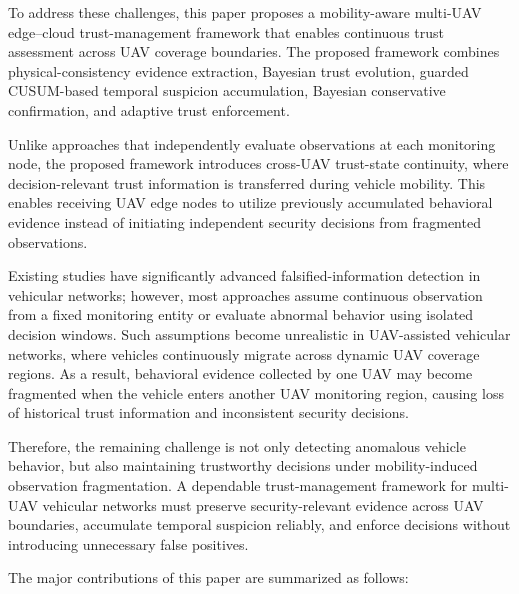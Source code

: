 \documentclass[journal]{IEEEtran}
\begin{document}
To address these challenges, this paper proposes a mobility-aware multi-UAV
edge--cloud trust-management framework that enables continuous trust
assessment across UAV coverage boundaries. The proposed framework combines
physical-consistency evidence extraction, Bayesian trust evolution, guarded
CUSUM-based temporal suspicion accumulation, Bayesian conservative
confirmation, and adaptive trust enforcement.

Unlike approaches that independently evaluate observations at each monitoring
node, the proposed framework introduces cross-UAV trust-state continuity,
where decision-relevant trust information is transferred during vehicle
mobility. This enables receiving UAV edge nodes to utilize previously
accumulated behavioral evidence instead of initiating independent security
decisions from fragmented observations.

Existing studies have significantly advanced falsified-information detection
in vehicular networks; however, most approaches assume continuous observation
from a fixed monitoring entity or evaluate abnormal behavior using isolated
decision windows. Such assumptions become unrealistic in UAV-assisted
vehicular networks, where vehicles continuously migrate across dynamic UAV
coverage regions. As a result, behavioral evidence collected by one UAV may
become fragmented when the vehicle enters another UAV monitoring region,
causing loss of historical trust information and inconsistent security
decisions.

Therefore, the remaining challenge is not only detecting anomalous vehicle
behavior, but also maintaining trustworthy decisions under mobility-induced
observation fragmentation. A dependable trust-management framework for
multi-UAV vehicular networks must preserve security-relevant evidence across
UAV boundaries, accumulate temporal suspicion reliably, and enforce decisions
without introducing unnecessary false positives.

The major contributions of this paper are summarized as follows:
\end{document}
